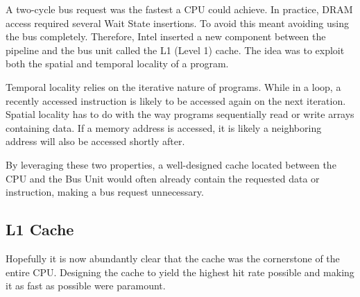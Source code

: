 \par
{}
\par
A two-cycle bus request was the fastest a CPU could achieve. In practice, DRAM access required several Wait State insertions.
To avoid this meant avoiding using the bus completely. Therefore, Intel inserted a new component between the pipeline and the bus unit called the L1 (Level 1) cache. The idea was to exploit both the spatial and temporal locality of a program.\\
\par
Temporal locality relies on the iterative nature of programs. While in a loop, a recently accessed instruction is likely to be accessed again on the next iteration. Spatial locality has to do with the way programs sequentially read or write arrays containing data. If a memory address is accessed, it is likely a neighboring address will also be accessed shortly after.\\
\par
By leveraging these two properties, a well-designed cache located between the CPU and the Bus Unit would often already contain the requested data or instruction, making a bus request unnecessary.\\
\par
{}



\vspace{-20pt}
\subsection{L1 Cache}
Hopefully it is now abundantly clear that the cache was the cornerstone of the entire CPU. Designing the cache to yield the highest hit rate possible and making it as fast as possible were paramount. 

